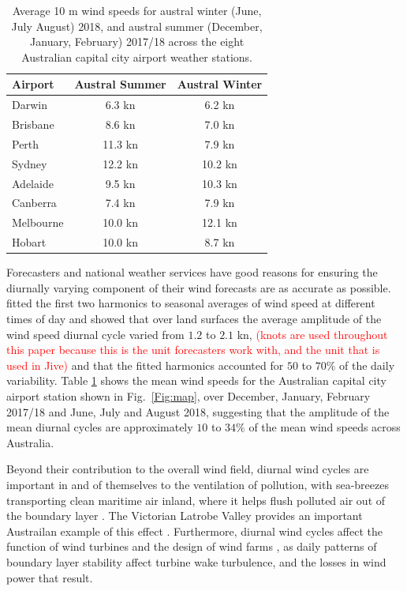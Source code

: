 \documentclass{ametsoc}
\begin{document}
\begin{table}
\begin{center}
\begin{tabular}{l |c|c}
Airport & Austral Summer & Austral Winter \\
\hline
Darwin  & 6.3 kn& 6.2 kn \\
Brisbane  & 8.6 kn& 7.0 kn \\
Perth  & 11.3 kn& 7.9 kn \\
Sydney  & 12.2 kn & 10.2 kn \\
Adelaide  & 9.5 kn & 10.3 kn \\
Canberra  & 7.4 kn & 7.9 kn \\
Melbourne  & 10.0 kn & 12.1 kn \\
Hobart & 10.0 kn & 8.7 kn
\end{tabular}
\caption{Average 10 m wind speeds for austral winter (June, July August) 2018, and austral summer (December, January, February) 2017/18 across the eight Australian capital city airport weather stations.}
\label{Tab:Speeds}
\end{center}
\end{table}

Forecasters and national weather services have good reasons for ensuring the diurnally varying component of their wind forecasts are as accurate as possible. \citet{dai99} fitted the first two harmonics to seasonal averages of wind speed at different times of day and showed that over land surfaces the average amplitude of the wind speed diurnal cycle varied from $1.2$ to $2.1$ kn, \textcolor{red}{(knots are used throughout this paper because this is the unit forecasters work with, and the unit that is used in Jive)} and that the fitted harmonics accounted for $50$ to $70\%$ of the daily variability. Table \ref{Tab:Speeds} shows the mean wind speeds for the Australian capital city airport station shown in Fig.~\ref{Fig:map}, over December, January, February 2017/18 and June, July and August 2018, suggesting that the amplitude of the mean diurnal cycles are approximately $10$ to $34\%$ of the mean wind speeds across Australia. 

Beyond their contribution to the overall wind field, diurnal wind cycles are important in and of themselves to the ventilation of pollution, with sea-breezes transporting clean maritime air inland, where it helps flush polluted air out of the boundary layer \citep{miller03}. The Victorian Latrobe Valley provides an important Austrailan example of this effect \citep{physick92}. Furthermore, diurnal wind cycles affect the function of wind turbines \citep{englberger18} and the design of wind farms \citep{abkar16}, as daily patterns of boundary layer stability affect turbine wake turbulence, and the losses in wind power that result. 
\end{document}
